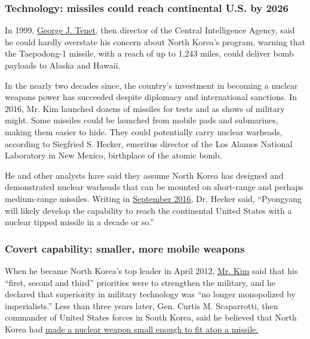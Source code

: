 \hypertarget{technology-missiles-could-reach-continental-us-by-2026}{%
\subsubsection{\texorpdfstring{\textbf{Technology: missiles could reach
continental U.S. by
2026}}{Technology: missiles could reach continental U.S. by 2026}}\label{technology-missiles-could-reach-continental-us-by-2026}}

In 1999,
\href{http://www.nytimes3xbfgragh.onion/1999/02/03/world/cia-sees-a-north-korean-missile-threat.html}{George
J. Tenet}, then director of the Central Intelligence Agency, said he
could hardly overstate his concern about North Korea's program, warning
that the Taepodong-1 missile, with a reach of up to 1,243 miles, could
deliver bomb payloads to Alaska and Hawaii.

In the nearly two decades since, the country's investment in becoming a
nuclear weapons power has succeeded despite diplomacy and international
sanctions. In 2016, Mr. Kim launched dozens of missiles for tests and as
shows of military might. Some missiles could be launched from mobile
pads and submarines, making them easier to hide. They could potentially
carry nuclear warheads, according to Siegfried S. Hecker, emeritus
director of the Los Alamos National Laboratory in New Mexico, birthplace
of the atomic bomb.

He and other analysts have said they assume North Korea has designed and
demonstrated nuclear warheads that can be mounted on short-range and
perhaps medium-range missiles. Writing in
\href{http://38north.org/2016/09/shecker091216/}{September 2016}, Dr.
Hecker said, ``Pyongyang will likely develop the capability to reach the
continental United States with a nuclear tipped missile in a decade or
so.''

\hypertarget{covert-capability-smaller-more-mobile-weapons}{%
\subsubsection{\texorpdfstring{\textbf{Covert capability: smaller, more
mobile
weapons}}{Covert capability: smaller, more mobile weapons}}\label{covert-capability-smaller-more-mobile-weapons}}

When he became North Korea's top leader in April 2012,
\href{http://topics.nytimes3xbfgragh.onion/top/reference/timestopics/people/k/kim_jongun/index.html?inline=nyt-per}{Mr.
Kim} said that his ``first, second and third'' priorities were to
strengthen the military, and he declared that superiority in military
technology was ``no longer monopolized by imperialists.'' Less than
three years later, Gen. Curtis M. Scaparrotti, then commander of United
States forces in South Korea, said he believed that North Korea had
\href{https://www.nytimes3xbfgragh.onion/2014/10/25/world/asia/us-commander-sees-key-nuclear-step-by-north-korea.html}{made
a nuclear weapon small enough to fit atop a missile.}

